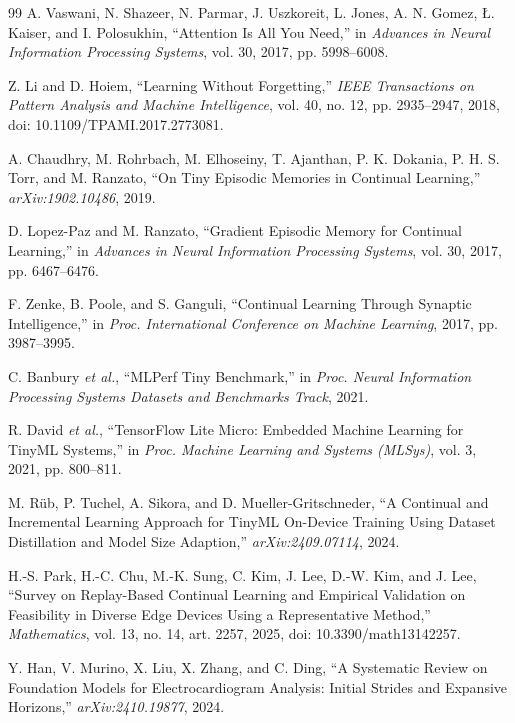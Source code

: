 \begin{thebibliography}{99}
A. Vaswani, N. Shazeer, N. Parmar, J. Uszkoreit, L. Jones, A. N. Gomez,
{\L}. Kaiser, and I. Polosukhin,
``Attention Is All You Need,''
in \emph{Advances in Neural Information Processing Systems},
vol. 30, 2017, pp. 5998--6008.

Z. Li and D. Hoiem,
``Learning Without Forgetting,''
\emph{IEEE Transactions on Pattern Analysis and Machine Intelligence},
vol. 40, no. 12, pp. 2935--2947, 2018,
doi: 10.1109/TPAMI.2017.2773081.

A. Chaudhry, M. Rohrbach, M. Elhoseiny, T. Ajanthan, P. K. Dokania,
P. H. S. Torr, and M. Ranzato,
``On Tiny Episodic Memories in Continual Learning,''
\emph{arXiv:1902.10486}, 2019.

D. Lopez-Paz and M. Ranzato,
``Gradient Episodic Memory for Continual Learning,''
in \emph{Advances in Neural Information Processing Systems},
vol. 30, 2017, pp. 6467--6476.

F. Zenke, B. Poole, and S. Ganguli,
``Continual Learning Through Synaptic Intelligence,''
in \emph{Proc. International Conference on Machine Learning},
2017, pp. 3987--3995.

C. Banbury \emph{et al.},
``MLPerf Tiny Benchmark,''
in \emph{Proc. Neural Information Processing Systems Datasets and Benchmarks
Track}, 2021.

R. David \emph{et al.},
``TensorFlow Lite Micro: Embedded Machine Learning for TinyML Systems,''
in \emph{Proc. Machine Learning and Systems (MLSys)}, vol. 3, 2021,
pp. 800--811.


M. R\"ub, P. Tuchel, A. Sikora, and D. Mueller-Gritschneder,
``A Continual and Incremental Learning Approach for TinyML On-Device Training
Using Dataset Distillation and Model Size Adaption,''
\emph{arXiv:2409.07114}, 2024.

H.-S. Park, H.-C. Chu, M.-K. Sung, C. Kim, J. Lee, D.-W. Kim, and J. Lee,
``Survey on Replay-Based Continual Learning and Empirical Validation on
Feasibility in Diverse Edge Devices Using a Representative Method,''
\emph{Mathematics}, vol. 13, no. 14, art. 2257, 2025,
doi: 10.3390/math13142257.

Y. Han, V. Murino, X. Liu, X. Zhang, and C. Ding,
``A Systematic Review on Foundation Models for Electrocardiogram Analysis:
Initial Strides and Expansive Horizons,''
\emph{arXiv:2410.19877}, 2024.


\end{thebibliography}
